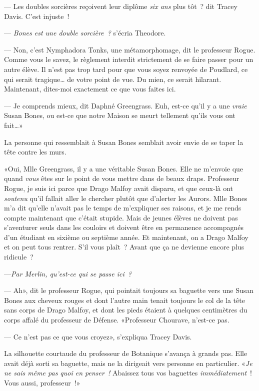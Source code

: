 --- Les doubles sorcières reçoivent leur diplôme \emph{six ans} plus tôt~? dit Tracey Davis. C'est injuste~!

--- \emph{Bones est une double sorcière~?} s'écria Theodore.

--- Non, c'est Nymphadora Tonks, une métamorphomage, dit le professeur Rogue. Comme vous le savez, le règlement interdit strictement de se faire passer pour un autre élève. Il n'est pas trop tard pour que vous soyez renvoyée de Poudlard, ce qui serait tragique… de votre point de vue. Du mien, ce serait hilarant. Maintenant, dites-moi exactement ce que vous faites ici.

--- Je comprends mieux, dit Daphné Greengrass. Euh, est-ce qu'il y a une \emph{vraie} Susan Bones, ou est-ce que notre Maison se meurt tellement qu'ils vous ont fait…»

La personne qui ressemblait à Susan Bones semblait avoir envie de se taper la tête contre les murs.

«Oui, Mlle Greengrass, il y a une véritable Susan Bones. Elle ne m'envoie que quand \emph{vous} êtes sur le point de vous mettre dans de beaux draps. Professeur Rogue, je suis ici parce que Drago Malfoy avait disparu, et que ceux-là ont \emph{soutenu} qu'il fallait aller le chercher plutôt que d'alerter les Aurors. Mlle Bones m'a dit qu'elle n'avait pas le temps de m'expliquer ses raisons, et je me rends compte maintenant que c'était stupide. Mais de jeunes élèves ne doivent pas s'aventurer seuls dans les couloirs et doivent être en permanence accompagnés d'un étudiant en sixième ou septième année. Et maintenant, on a Drago Malfoy et on peut tous rentrer. S'il vous plaît~? Avant que ça ne devienne encore plus ridicule~?

---\emph{Par Merlin, qu'est-ce qui se passe ici~?}

--- Ah», dit le professeur Rogue, qui pointait toujours sa baguette vers une Susan Bones aux cheveux rouges et dont l'autre main tenait toujours le col de la tête sans corps de Drago Malfoy, et dont les pieds étaient à quelques centimètres du corps affalé du professeur de Défense. «Professeur Chourave, n'est-ce pas.

--- Ce n'est pas ce que vous croyez», s'expliqua Tracey Davis.

La silhouette courtaude du professeur de Botanique s'avança à grands pas. Elle avait déjà sorti sa baguette, mais ne la dirigeait vers personne en particulier. «\emph{Je ne sais même pas quoi en penser~!} Abaissez tous vos baguettes \emph{immédiatement}~! Vous aussi, professeur~!»

